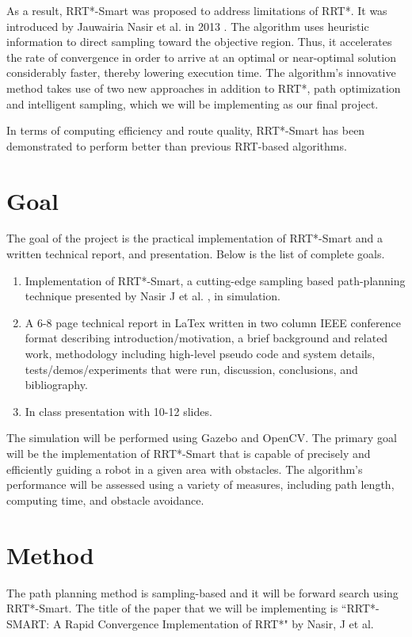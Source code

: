 \documentclass[12pt]{extarticle}
\begin{document}
As a result, RRT*-Smart was proposed to address limitations of RRT*. It was introduced by Jauwairia Nasir et al. in 2013 \cite{Jau}. The algorithm uses heuristic information to direct sampling toward the objective region. Thus, it accelerates the rate of convergence in order to arrive at an optimal or near-optimal solution considerably faster, thereby lowering execution time. The algorithm's innovative method takes use of two new approaches  in addition to RRT*, path optimization and intelligent sampling, which we will be implementing as our final project. 

In terms of computing efficiency and route quality, RRT*-Smart has been demonstrated to perform better than previous RRT-based algorithms.

\section{Goal}
\hspace{\parindent}The goal of the project is the practical implementation of RRT*-Smart and a written technical report, and presentation. Below is the list of complete goals.

\begin{enumerate}
	\item Implementation of RRT*-Smart, a cutting-edge sampling based path-planning technique presented by Nasir J et al. \cite{Jau}, in simulation.
	\item A 6-8 page technical report in LaTex written in two column IEEE conference format describing introduction/motivation, a brief background and related work, methodology including high-level pseudo code and system details, tests/demos/experiments that were run, discussion, conclusions, and bibliography.
	\item In class presentation with 10-12 slides.
\end{enumerate}

The simulation will be performed using Gazebo and OpenCV. The primary goal will be the implementation of RRT*-Smart that is capable of precisely and efficiently guiding a robot in a given area with obstacles. The algorithm's performance will be assessed using a variety of measures, including path length, computing time, and obstacle avoidance.

\section{Method}
\hspace{\parindent}The path planning method is sampling-based and it will be forward search using RRT*-Smart. The title of the paper that we will be implementing is ``RRT*-SMART: A Rapid Convergence Implementation of RRT*" by Nasir, J et al\cite{Jau}.
\end{document}
